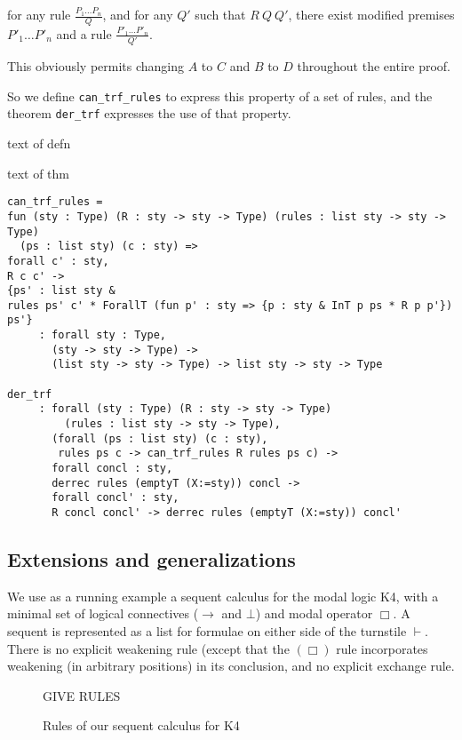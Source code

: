 \documentclass[a4paper,12pt]{llncs}
\begin{document}
for any rule $\displaystyle \frac{P_1 \ldots P_n} {Q}$,
and for any $Q'$ such that $R~Q~Q'$,
there exist modified premises ${P'_1 \ldots P'_n}$
and a rule $\displaystyle \frac {P'_1 \ldots P'_n} {Q'}$.

This obviously permits changing $A$ to $C$ and $B$ to $D$ 
throughout the entire proof.

So we define \texttt{can\_trf\_rules} to express this property 
of a set of rules,
and the theorem \texttt{der\_trf} expresses the use of that property.

\begin{definition}\label{def-can-trf-rules}
text of defn
\end{definition}

\begin{theorem} \label{t-der-trf}
text of thm
\end{theorem}

\begin{verbatim}
can_trf_rules = 
fun (sty : Type) (R : sty -> sty -> Type) (rules : list sty -> sty -> Type)
  (ps : list sty) (c : sty) =>
forall c' : sty,
R c c' ->
{ps' : list sty &
rules ps' c' * ForallT (fun p' : sty => {p : sty & InT p ps * R p p'}) ps'}
     : forall sty : Type,
       (sty -> sty -> Type) ->
       (list sty -> sty -> Type) -> list sty -> sty -> Type

der_trf
     : forall (sty : Type) (R : sty -> sty -> Type)
         (rules : list sty -> sty -> Type),
       (forall (ps : list sty) (c : sty),
        rules ps c -> can_trf_rules R rules ps c) ->
       forall concl : sty,
       derrec rules (emptyT (X:=sty)) concl ->
       forall concl' : sty,
       R concl concl' -> derrec rules (emptyT (X:=sty)) concl'
\end{verbatim}

\subsection{Extensions and generalizations}
We use as a running example a sequent calculus for the modal logic K4, 
with a minimal set of logical connectives ($\to$ and $\bot$)
and modal operator $\Box$.
A sequent is represented as a list for formulae on either side of the
turnstile $\vdash$.
There is no explicit weakening rule (except that the $(\Box)$ rule 
incorporates weakening (in arbitrary positions) in its conclusion,
and no explicit exchange rule.

\begin{figure}\label{k4-rules}
GIVE RULES 
\caption{Rules of our sequent calculus for K4}
\end{figure}
\end{document}
